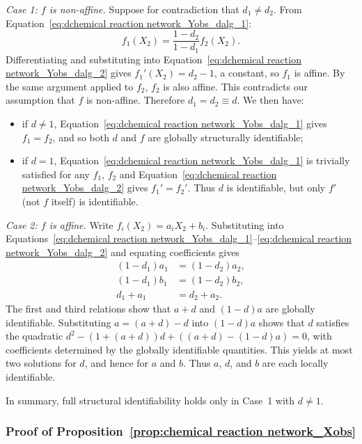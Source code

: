 \documentclass{article}
\theoremstyle{plain}
\theoremstyle{definition}
\begin{document}
{\medskip\noindent
\textit{Case 1: $f$ is non-affine.} Suppose for contradiction that $d_1 \neq d_2$. From Equation~\eqref{eq:dchemical reaction network_Yobs_dalg_1}:
\begin{equation*}
    f_1(X_2) = \frac{1-d_2}{1-d_1} f_2(X_2).
\end{equation*}
Differentiating and substituting into Equation~\eqref{eq:dchemical reaction network_Yobs_dalg_2} gives $f_1'(X_2) = d_2 - 1$, a constant, so $f_1$ is affine. By the same argument applied to $f_2$, $f_2$ is also affine. This contradicts our assumption that $f$ is non-affine. Therefore $d_1 = d_2 \equiv d$. We then have:
\begin{itemize}
    \item if $d \neq 1$, Equation~\eqref{eq:dchemical reaction network_Yobs_dalg_1} gives $f_1 = f_2$, and so both $d$ and $f$ are globally structurally identifiable;
    \item if $d = 1$, Equation~\eqref{eq:dchemical reaction network_Yobs_dalg_1} is trivially satisfied for any $f_1$, $f_2$ and  Equation~\eqref{eq:dchemical reaction network_Yobs_dalg_2} gives $f_1' = f_2'$. Thus $d$ is identifiable, but only $f'$ (not $f$ itself) is identifiable.
\end{itemize}

\medskip\noindent
\textit{Case 2: $f$ is affine.} Write $f_i(X_2) = a_i X_2 + b_i$. Substituting into Equations~\eqref{eq:dchemical reaction network_Yobs_dalg_1}--\eqref{eq:dchemical reaction network_Yobs_dalg_2} and equating coefficients gives
\begin{align*}
    (1-d_1)a_1 &= (1-d_2)a_2, \\
    (1-d_1)b_1 &= (1-d_2)b_2, \\
    d_1 + a_1  &= d_2 + a_2.
\end{align*}
The first and third relations show that $a + d$ and $(1-d)a$ are globally identifiable. Substituting $a = (a+d) - d$ into $(1-d)a$ shows that $d$ satisfies the quadratic $d^2 - (1 + (a+d))d + ((a+d) - (1-d)a) = 0$, with coefficients determined by the globally identifiable quantities. This yields at most two solutions for $d$, and hence for $a$ and $b$. Thus $a$, $d$, and $b$ are each locally identifiable. 

In summary, full structural identifiability holds only in Case~1 with $d \neq 1$.

\subsubsection{Proof of Proposition~\ref{prop:chemical reaction network_Xobs}} \label{appendix:proof_chemical reaction network_Xobs}

}
\end{document}
